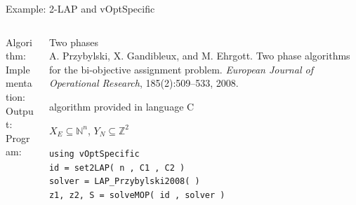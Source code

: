 \documentclass[10pt,xcolor=dvipsnames]{beamer}
\newcommand{\mN}{\mathbb{N}}
\newcommand{\Z}{\mathbb{Z}}
\begin{document}
\begin{frame}[fragile=singleslide]{Example: 2-LAP and vOptSpecific}

\vspace{5mm}
\begin{columns}
%
\begin{column}{0.2\textwidth}
Algorithm: \\
\vspace{15mm}
Implementation:\\  
\vspace{2mm}
Output: \\
\vspace{8mm}
Program:
\vspace{11mm}
\end{column}
\begin{column}{0.8\textwidth}
         Two phases  \vspace{1mm}\\
         {\footnotesize A. Przybylski, X. Gandibleux, and M. Ehrgott. Two phase algorithms for the bi-objective assignment problem.
         \textit{European Journal of Operational Research}, 185(2):509--533, 2008.\\}
\medskip

         algorithm provided in language C
\medskip

$X_E \subseteq \mN^n$, $Y_N \subseteq \Z^2$
\vspace{5mm}

{\footnotesize
\begin{verbatim}
using vOptSpecific   
id = set2LAP( n , C1 , C2 )
solver = LAP_Przybylski2008( ) 
z1, z2, S = solveMOP( id , solver ) 
\end{verbatim}
}          
\end{column}
%
\end{columns}         

\end{frame}
\end{document}
